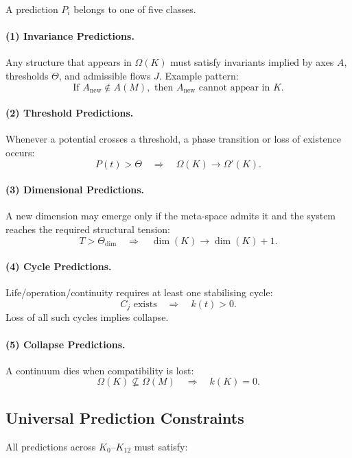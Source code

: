 A prediction $P_i$ belongs to one of five classes.

\paragraph{(1) Invariance Predictions.}
Any structure that appears in $\Omega(K)$ must satisfy invariants implied by  
axes $A$, thresholds $\Theta$, and admissible flows $J$.  
Example pattern:
\[
\text{If } A_{\mathrm{new}} \notin A(M), \text{ then } A_{\mathrm{new}} \text{ cannot appear in } K.
\]

\paragraph{(2) Threshold Predictions.}
Whenever a potential crosses a threshold, a phase transition or loss of  
existence occurs:
\[
P(t) > \Theta \quad\Rightarrow\quad \Omega(K)\to\Omega'(K).
\]

\paragraph{(3) Dimensional Predictions.}
A new dimension may emerge only if the meta-space admits it and the system  
reaches the required structural tension:
\[
T > \Theta_{\mathrm{dim}}
\quad\Rightarrow\quad
\dim(K)\to\dim(K)+1.
\]

\paragraph{(4) Cycle Predictions.}
Life/operation/continuity requires at least one stabilising cycle:
\[
C_j \text{ exists} \quad\Rightarrow\quad k(t)>0.
\]
Loss of all such cycles implies collapse.

\paragraph{(5) Collapse Predictions.}
A continuum dies when compatibility is lost:
\[
\Omega(K)\not\subseteq\Omega(M)
\quad\Rightarrow\quad
k(K)=0.
\]

\subsection{Universal Prediction Constraints}

All predictions across $K_0$–$K_{12}$ must satisfy:

